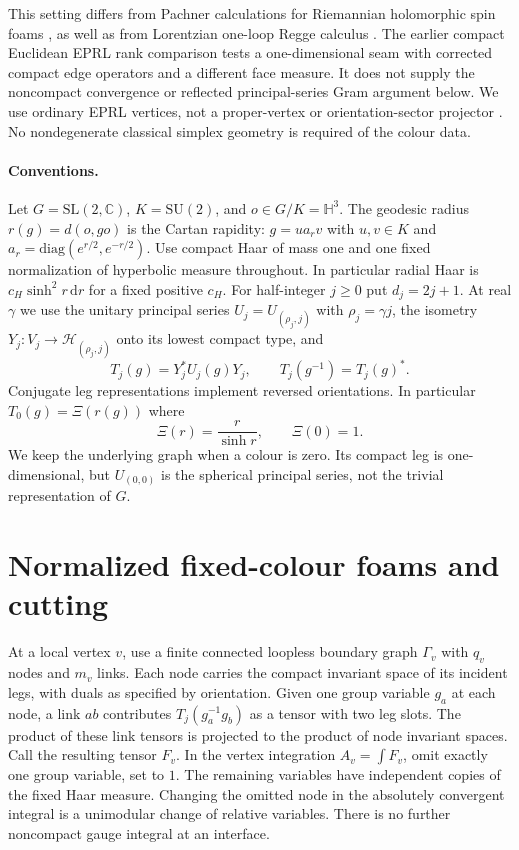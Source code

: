 \documentclass[11pt]{article}
\theoremstyle{remark}
\newcommand{\CC}{\mathbb C}
\newcommand{\HH}{\mathbb H}
\newcommand{\dd}{\mathrm d}
\newcommand{\bH}{\mathcal H}
\begin{document}
This setting differs from Pachner calculations for Riemannian holomorphic spin foams \cite{Banburski}, as well as from Lorentzian one-loop Regge calculus \cite{Borissova}. The earlier compact Euclidean EPRL rank comparison \cite{Euclidean} tests a one-dimensional seam with corrected compact edge operators and a different face measure. It does not supply the noncompact convergence or reflected principal-series Gram argument below. We use ordinary EPRL vertices, not a proper-vertex or orientation-sector projector \cite{Proper}. No nondegenerate classical simplex geometry is required of the colour data.

\paragraph{Conventions.}
Let \(G=\mathrm{SL}(2,\CC)\), \(K=\mathrm{SU}(2)\), and \(o\in G/K=\HH^3\). The geodesic radius \(r(g)=d(o,go)\) is the Cartan rapidity: \(g=u a_r v\) with \(u,v\in K\) and \(a_r=\mathrm{diag}(e^{r/2},e^{-r/2})\). Use compact Haar of mass one and one fixed normalization of hyperbolic measure throughout. In particular radial Haar is \(c_H\sinh^2r\,\dd r\) for a fixed positive \(c_H\). For half-integer \(j\ge0\) put \(d_j=2j+1\). At real \(\gamma\) we use the unitary principal series \(U_j=U_{(\rho_j,j)}\) with \(\rho_j=\gamma j\), the isometry \(Y_j:V_j\to\bH_{(\rho_j,j)}\) onto its lowest compact type, and
\begin{equation}\label{eq:T}
T_j(g)=Y_j^* U_j(g)Y_j,\qquad
T_j(g^{-1})=T_j(g)^*.
\end{equation}
Conjugate leg representations implement reversed orientations. In particular \(T_0(g)=\Xi(r(g))\) where
\begin{equation}\label{eq:Xi}
\Xi(r)=\frac{r}{\sinh r},\qquad \Xi(0)=1.
\end{equation}
We keep the underlying graph when a colour is zero. Its compact leg is one-dimensional, but \(U_{(0,0)}\) is the spherical principal series, not the trivial representation of \(G\).

\section{Normalized fixed-colour foams and cutting}\label{sec:sewing}

At a local vertex \(v\), use a finite connected loopless boundary graph \(\Gamma_v\) with \(q_v\) nodes and \(m_v\) links. Each node carries the compact invariant space of its incident legs, with duals as specified by orientation. Given one group variable \(g_a\) at each node, a link \(a b\) contributes \(T_j(g_a^{-1}g_b)\) as a tensor with two leg slots. The product of these link tensors is projected to the product of node invariant spaces. Call the resulting tensor \(F_v\). In the vertex integration \(A_v=\int F_v\), omit exactly one group variable, set to \(1\). The remaining variables have independent copies of the fixed Haar measure. Changing the omitted node in the absolutely convergent integral is a unimodular change of relative variables. There is no further noncompact gauge integral at an interface.
\end{document}

